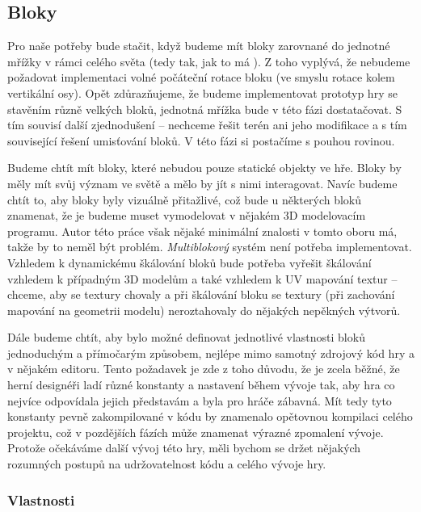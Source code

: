 
\subsection{Bloky}
\label{subsec:bloky}

Pro naše potřeby bude stačit, když budeme mít bloky zarovnané do jednotné mřížky v rámci celého světa (tedy tak, jak to má \MC{}).  Z toho vyplývá, že nebudeme požadovat implementaci volné počáteční rotace bloku (ve smyslu rotace kolem vertikální osy). Opět zdůrazňujeme, že budeme implementovat prototyp hry se stavěním různě velkých bloků, jednotná mřížka bude v této fázi dostatačovat. S tím souvisí další zjednodušení -- nechceme řešit terén ani jeho modifikace a s tím související řešení umisťování bloků. V této fázi si postačíme s pouhou rovinou.


Budeme chtít mít bloky, které nebudou pouze statické objekty ve hře. Bloky by měly mít svůj význam ve světě a mělo by jít s nimi interagovat. Navíc budeme chtít to, aby bloky byly vizuálně přitažlivé, což bude u některých bloků znamenat, že je budeme muset vymodelovat v nějakém 3D modelovacím programu. Autor této práce však nějaké minimální znalosti v tomto oboru má, takže by to neměl být problém. \textit{Multiblokový} systém není potřeba implementovat. Vzhledem k dynamickému škálování bloků bude potřeba vyřešit škálování vzhledem k případným 3D modelům a také vzhledem k UV mapování textur -- chceme, aby se textury chovaly  a při škálování bloku se textury (při zachování mapování na geometrii modelu) neroztahovaly do nějakých nepěkných výtvorů. 


Dále budeme chtít, aby bylo možné definovat jednotlivé vlastnosti bloků jednoduchým a přímočarým způsobem, nejlépe mimo samotný zdrojový kód hry a v nějakém editoru. Tento požadavek je zde z toho důvodu, že je zcela běžné, že herní designéři ladí různé konstanty a nastavení během vývoje tak, aby hra co nejvíce odpovídala jejich představám a byla pro hráče zábavná. Mít tedy tyto konstanty pevně zakompilované v kódu by znamenalo opětovnou kompilaci celého projektu, což v pozdějších fázích může znamenat výrazné zpomalení vývoje. Protože očekáváme další vývoj této hry, měli bychom se držet nějakých rozumných postupů na udržovatelnost kódu a celého vývoje hry.

\subsubsection{Vlastnosti}

